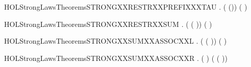 \newcommand{\HOLStrongLawsTheoremsSTRONGXXRESTRXXPREFIXXXLABEL}{\UseVerbatim{HOLStrongLawsTheoremsSTRONGXXRESTRXXPREFIXXXLABEL}}
\begin{SaveVerbatim}{HOLStrongLawsTheoremsSTRONGXXRESTRXXPREFIXXXTAU}
\HOLTokenTurnstile{} \HOLSymConst{\HOLTokenForall{}} .  (\HOLConst{\ensuremath{\nu}}  (\HOLConst{\ensuremath{\tau}})) (\HOLConst{\ensuremath{\tau}}\HOLConst{\ensuremath{\nu}}  )
\end{SaveVerbatim}
\newcommand{\HOLStrongLawsTheoremsSTRONGXXRESTRXXPREFIXXXTAU}{\UseVerbatim{HOLStrongLawsTheoremsSTRONGXXRESTRXXPREFIXXXTAU}}
\begin{SaveVerbatim}{HOLStrongLawsTheoremsSTRONGXXRESTRXXSUM}
\HOLTokenTurnstile{} \HOLSymConst{\HOLTokenForall{}}  .  (\HOLConst{\ensuremath{\nu}}  ( \HOLSymConst{\ensuremath{+}} )) (\HOLConst{\ensuremath{\nu}}   \HOLSymConst{\ensuremath{+}} \HOLConst{\ensuremath{\nu}}  )
\end{SaveVerbatim}
\newcommand{\HOLStrongLawsTheoremsSTRONGXXRESTRXXSUM}{\UseVerbatim{HOLStrongLawsTheoremsSTRONGXXRESTRXXSUM}}
\begin{SaveVerbatim}{HOLStrongLawsTheoremsSTRONGXXSUMXXASSOCXXL}
\HOLTokenTurnstile{} \HOLSymConst{\HOLTokenForall{}}  .  ( \HOLSymConst{\ensuremath{+}} ( \HOLSymConst{\ensuremath{+}} )) ( \HOLSymConst{\ensuremath{+}}  \HOLSymConst{\ensuremath{+}} )
\end{SaveVerbatim}
\newcommand{\HOLStrongLawsTheoremsSTRONGXXSUMXXASSOCXXL}{\UseVerbatim{HOLStrongLawsTheoremsSTRONGXXSUMXXASSOCXXL}}
\begin{SaveVerbatim}{HOLStrongLawsTheoremsSTRONGXXSUMXXASSOCXXR}
\HOLTokenTurnstile{} \HOLSymConst{\HOLTokenForall{}}  .  ( \HOLSymConst{\ensuremath{+}}  \HOLSymConst{\ensuremath{+}} ) ( \HOLSymConst{\ensuremath{+}} ( \HOLSymConst{\ensuremath{+}} ))
\end{SaveVerbatim}
